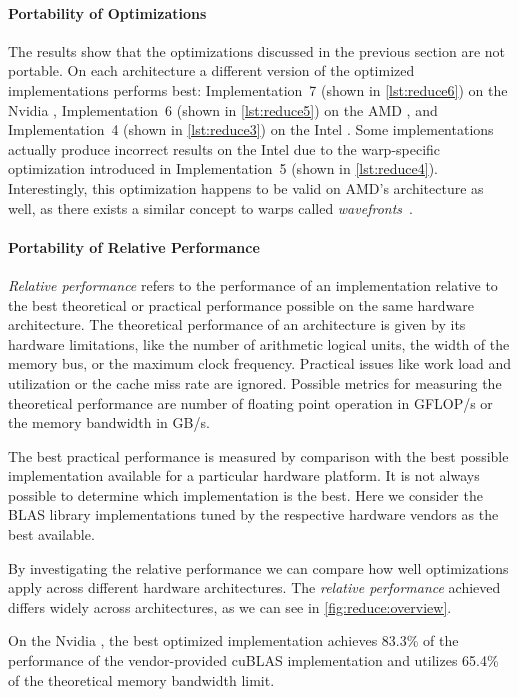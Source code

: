 \paragraph{Portability of Optimizations}
The results show that the optimizations discussed in the previous section are not portable.
On each architecture a different version of the optimized implementations performs best:
Implementation~7 (shown in \autoref{lst:reduce6}) on the Nvidia \GPU, Implementation~6 (shown in \autoref{lst:reduce5}) on the AMD \GPU, and Implementation~4 (shown in \autoref{lst:reduce3}) on the Intel \CPU.
Some implementations actually produce incorrect results on the Intel \CPU due to the warp-specific optimization introduced in Implementation~5 (shown in \autoref{lst:reduce4}).
Interestingly, this optimization happens to be valid on AMD's \GPU architecture as well, as there exists a similar concept to warps called \emph{wavefronts}~\cite{AMDGCN2012}.

\paragraph{Portability of Relative Performance}
\emph{Relative performance} refers to the performance of an implementation relative to the best theoretical or practical performance possible on the same hardware architecture.
The theoretical performance of an architecture is given by its hardware limitations, like the number of arithmetic logical units, the width of the memory bus, or the maximum clock frequency.
Practical issues like work load and utilization or the cache miss rate are ignored.
Possible metrics for measuring the theoretical performance are number of floating point operation in GFLOP/s or the memory bandwidth in GB/s.

The best practical performance is measured by comparison with the best possible implementation available for a particular hardware platform.
It is not always possible to determine which implementation is the best.
Here we consider the BLAS library implementations tuned by the respective hardware vendors as the best available.

By investigating the relative performance we can compare how well optimizations apply across different hardware architectures.
The \emph{relative performance} achieved differs widely across architectures, as we can see in \autoref{fig:reduce:overview}.

On the Nvidia \GPU, the best optimized implementation achieves 83.3\% of the performance of the vendor-provided cuBLAS implementation and utilizes 65.4\% of the theoretical memory bandwidth limit.

